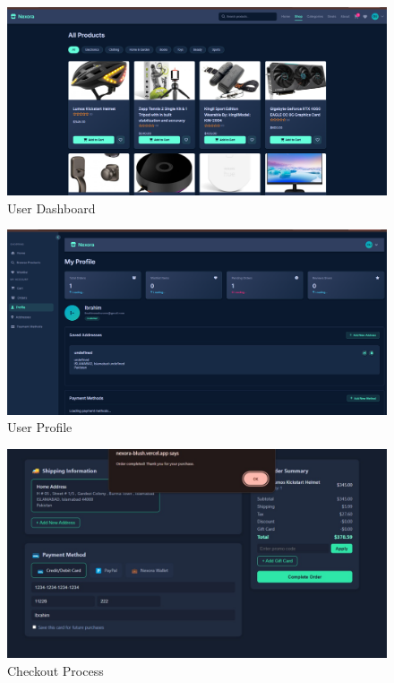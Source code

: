 \begin{figure}[htbp]
\centering
\includegraphics[width=\textwidth,keepaspectratio]{thesis/figures/User-Dashboard.png}
\caption{User Dashboard}
\label{fig:user-dashboard}
\end{figure}

\begin{figure}[htbp]
\centering
\includegraphics[width=\textwidth,keepaspectratio]{thesis/figures/User-Profile.png}
\caption{User Profile}
\label{fig:user-profile}
\end{figure}

\begin{figure}[htbp]
\centering
\includegraphics[width=\textwidth,keepaspectratio]{thesis/figures/Checkout.jpg}
\caption{Checkout Process}
\label{fig:checkout}
\end{figure}

